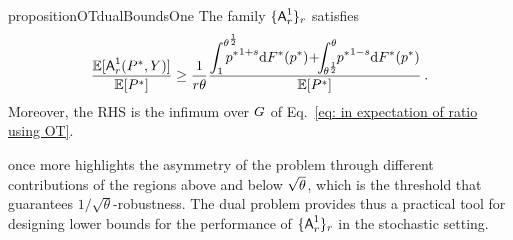 \begin{restatable}{proposition}{OTdualBoundsOne}\label{prop: [stochastic predictions] OT dual bounds}
    The family $\{\mbox{\textup{\textsf{A}}}^1_r\}_{r}$ satisfies
    \begin{align}
    \frac{\Eb[\algone(\Price,\Pred)]}{\Eb[\Price]}\ge\frac{1}{\rob\ub} \frac{\displaystyle \int_\lb^{\ub^{\frac12}}\hspace{-11pt} {\price}^{1+\smth}\de\dprice(\price) \hspace{-2pt}+\hspace{-4pt} \int_{\hspace{-1pt}\ub^{\frac12}}^\ub\hspace{-3pt} {\price}^{1-\smth}\de\dprice(\price)}{\Eb[P^*]}\hspace{2pt}.\notag
    \end{align}
    Moreover, the RHS is the infimum over $G$ of Eq.~\eqref{eq: in expectation of ratio using OT}.
\end{restatable}


 once more highlights the asymmetry of the problem through different contributions of the regions above and below $\sqrt{\theta}$, which is the threshold that guarantees $1/\sqrt{\theta}$-robustness. The dual problem provides thus a practical tool for designing lower bounds for the performance of $\{\mbox{\textup{\textsf{A}}}^1_r\}_{r}$ in the stochastic \OMS{} setting.